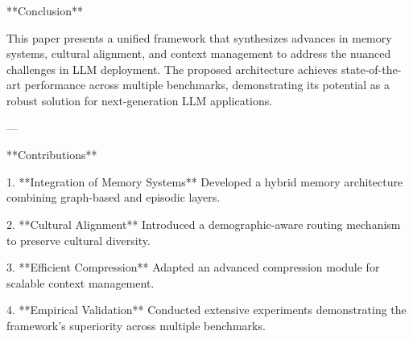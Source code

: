 **Conclusion**

This paper presents a unified framework that synthesizes advances in memory systems, cultural alignment, and context management to address the nuanced challenges in LLM deployment. The proposed architecture achieves state-of-the-art performance across multiple benchmarks, demonstrating its potential as a robust solution for next-generation LLM applications.

---

**Contributions**

1. **Integration of Memory Systems**  
   Developed a hybrid memory architecture combining graph-based and episodic layers.

2. **Cultural Alignment**  
   Introduced a demographic-aware routing mechanism to preserve cultural diversity.

3. **Efficient Compression**  
   Adapted an advanced compression module for scalable context management.

4. **Empirical Validation**  
   Conducted extensive experiments demonstrating the framework's superiority across multiple benchmarks.
